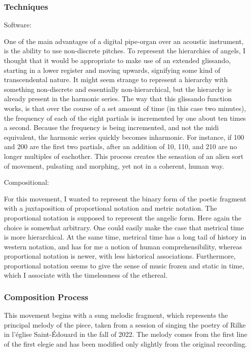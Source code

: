 \documentclass[12pt,twoside,maitrise]{dms}
\theoremstyle{definition}
\begin{document}
\subsubsection{Techniques}

Software:

One of the main advantages of a digital pipe-organ over an acoustic instrument, is the ability to use non-discrete pitches. To represent the hierarchies of angels, I thought that it would be appropriate to make use of an extended glissando, starting in a lower register and moving upwards, signifying some kind of transcendental nature. It might seem strange to represent a hierarchy with something non-discrete and essentially non-hierarchical, but the hierarchy is already present in the harmonic series. The way that this glissando function works, is that over the course of a set amount of time (in this case two minutes), the frequency of each of the eight partials is incremented by one about ten times a second. Because the frequency is being incremented, and not the midi equivalent, the harmonic series quickly becomes inharmonic. For instance, if 100 and 200 are the first two partials, after an addition of 10, 110, and 210 are no longer multiples of eachother. This process creates the sensation of an alien sort of movement, pulsating and morphing, yet not in a coherent, human way.    

Compositional:

For this movement, I wanted to represent the binary form of the poetic fragment with a juxtaposition of proportional notation and metric notation.
The proportional notation is supposed to represent the angelic form.
Here again the choice is somewhat arbitrary.
One could easily make the case that metrical time is more hierarchical.
At the same time, metrical time has a long tail of history in western notation, and has for me a notion of human comprehensibility, whereas proportional notation is newer, with less historical associations.
Furthermore, proportional notation seems to give the sense of music frozen and static in time, which I associate with the timelessness of the ethereal.

\subsubsection{Composition Process}

This movement begins with a sung melodic fragment, which represents the principal melody of the piece, taken from a session of singing the poetry of Rilke in l'église Saint-Édouard in the fall of 2022. The melody comes from the first line of the first elegie and has been modified only slightly from the original recording. 
\end{document}
